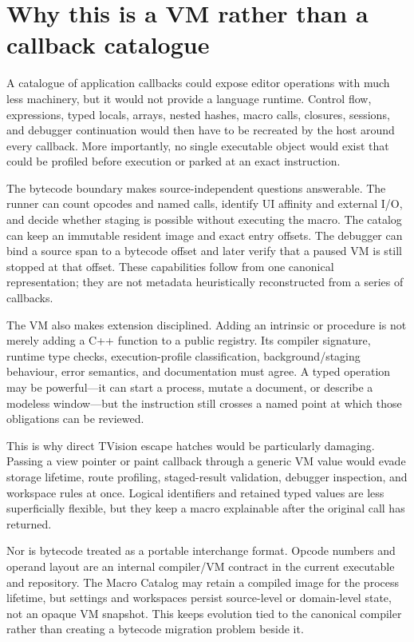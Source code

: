 \documentclass[a4paper,10pt,twoside,openany]{book}
\begin{document}
\section{Why this is a VM rather than a callback catalogue}

A catalogue of application callbacks could expose editor operations with much
less machinery, but it would not provide a language runtime. Control flow,
expressions, typed locals, arrays, nested hashes, macro calls, closures,
sessions, and debugger continuation would then have to be recreated by the
host around every callback. More importantly, no single executable object
would exist that could be profiled before execution or parked at an exact
instruction.

The bytecode boundary makes source-independent questions answerable. The
runner can count opcodes and named calls, identify UI affinity and external
I/O, and decide whether staging is possible without executing the macro. The
catalog can keep an immutable resident image and exact entry offsets. The
debugger can bind a source span to a bytecode offset and later verify that a
paused VM is still stopped at that offset. These capabilities follow from one
canonical representation; they are not metadata heuristically reconstructed
from a series of callbacks.

The VM also makes extension disciplined. Adding an intrinsic or procedure is
not merely adding a C++ function to a public registry. Its compiler signature,
runtime type checks, execution-profile classification, background/staging
behaviour, error semantics, and documentation must agree. A typed operation
may be powerful---it can start a process, mutate a document, or describe a
modeless window---but the instruction still crosses a named point at which
those obligations can be reviewed.

This is why direct TVision escape hatches would be particularly damaging.
Passing a view pointer or paint callback through a generic VM value would evade
storage lifetime, route profiling, staged-result validation, debugger
inspection, and workspace rules at once. Logical identifiers and retained
typed values are less superficially flexible, but they keep a macro
explainable after the original call has returned.

Nor is bytecode treated as a portable interchange format. Opcode numbers and
operand layout are an internal compiler/VM contract in the current executable
and repository. The Macro Catalog may retain a compiled image for the process
lifetime, but settings and workspaces persist source-level or domain-level
state, not an opaque VM snapshot. This keeps evolution tied to the canonical
compiler rather than creating a bytecode migration problem beside it.
\end{document}
